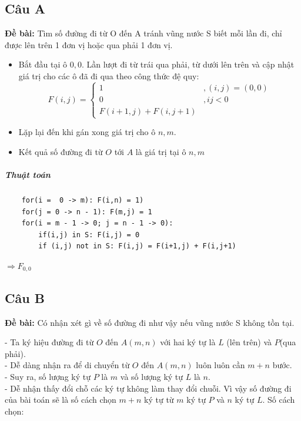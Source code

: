 \documentclass[12pt]{article}
\begin{document}
\begin{sloppypar}
\subsection{Câu A}
\begin{tcolorbox}
    \textbf{Đề bài:} Tìm số đường đi từ O đến A tránh vũng nước S biết mỗi lần đi, chỉ được lên trên 1 đơn vị hoặc qua phải 1 đơn vị.
\end{tcolorbox}

\begin{itemize}
    \item Bắt đầu tại ô \(0,0\). Lần lượt đi từ trái qua phải, từ dưới lên trên và cập nhật giá trị cho các ô đã đi qua theo công thức đệ quy:
    \[ F(i,j) = 
    \begin{cases}
        1     & , (i,j) = (0,0) \\
        0     &, ij < 0 \\
        F(i + 1,j) + F(i, j + 1) 
    \end{cases}
    \]
    \item Lặp lại đến khi gán xong giá trị cho ô \(n,m\).
    \item Kết quả số đường đi từ \(O\) tới \(A\) là giá trị tại ô \(n,m\)
\end{itemize}

\subparagraph{Thuật toán}
\begin{verbatim}
    for(i =  0 -> m): F(i,n) = 1)
    for(j = 0 -> n - 1): F(m,j) = 1
    for(i = m - 1 -> 0; j = n - 1 -> 0):
        if(i,j) in S: F(i,j) = 0
        if (i,j) not in S: F(i,j) = F(i+1,j) + F(i,j+1)
\end{verbatim}

\(\Rightarrow F_{0,0}\)

\subsection{Câu B}
\begin{tcolorbox}
    \textbf{Đề bài:} Có nhận xét gì về số đường đi như vậy nếu vũng nước S không tồn tại.
\end{tcolorbox}

- Ta ký hiệu đường đi từ \(O\) đến \(A(m,n)\) với hai ký tự là \(L\) (lên trên) và \(P\)(qua phải). \\
- Dễ dàng nhận ra để di chuyển từ \(O\) đến \(A(m,n)\) luôn luôn cần \(m+n\) bước. \\
- Suy ra, số lượng ký tự \(P\) là \(m\) và số lượng ký tự \(L\) là \(n\). \\
- Dễ nhận thấy đổi chỗ các ký tự không làm thay đổi chuỗi. Vì vậy số đường đi của bài toán sẽ là số cách chọn \(m+n\) ký tự từ \(m\) ký tự \(P\) và \(n\) ký tự \(L\). Số cách chọn:


\end{sloppypar}
\end{document}
